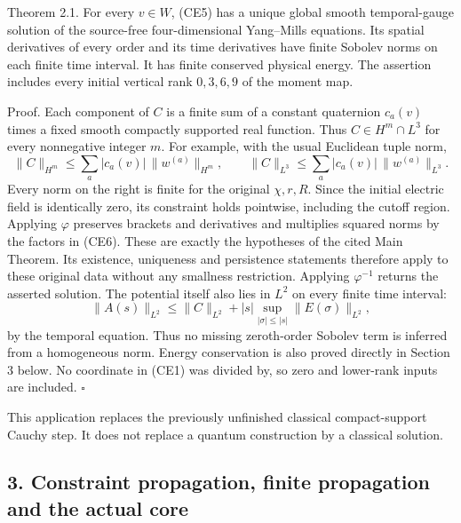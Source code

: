 \documentclass[11pt]{article}
\begin{document}
Theorem 2.1. For every \(v\in W\), (CE5) has a unique global smooth
temporal-gauge solution of the source-free four-dimensional Yang–Mills
equations. Its spatial derivatives of every order and its time
derivatives have finite Sobolev norms on each finite time interval.
It has finite conserved physical energy. The assertion includes every
initial vertical rank \(0,3,6,9\) of the moment map.

Proof. Each component of \(C\) is a finite sum of a constant
quaternion \(c_a(v)\) times a fixed smooth compactly supported real
function. Thus \(C\in H^m\cap L^3\) for every nonnegative integer \(m\).
For example, with the usual Euclidean tuple norm,
\[
 \|C\|_{H^m}\leq\sum_a |c_a(v)|\,\|w^{(a)}\|_{H^m},\qquad
 \|C\|_{L^3}\leq\sum_a |c_a(v)|\,\|w^{(a)}\|_{L^3}.
 \tag{CE7}
\]
Every norm on the right is finite for the original \(\chi,r,R\).
Since the initial electric field is identically zero, its constraint
holds pointwise, including the cutoff region. Applying \(\varphi\)
preserves brackets and derivatives and multiplies squared norms by
the factors in (CE6). These are exactly the hypotheses of the cited
Main Theorem. Its existence, uniqueness and persistence statements
therefore apply to these original data without any smallness
restriction. Applying \(\varphi^{-1}\) returns the asserted solution.
The potential itself also lies in \(L^2\) on every finite time interval:
\[
 \|A(s)\|_{L^2}\leq\|C\|_{L^2}
       +|s|\sup_{|\sigma|\leq|s|}\|E(\sigma)\|_{L^2},
\]
by the temporal equation. Thus no missing zeroth-order Sobolev term is
inferred from a homogeneous norm.
Energy conservation is also proved directly in Section 3 below.
No coordinate in (CE1) was divided by, so zero and lower-rank inputs
are included. \(\square\)

This application replaces the previously unfinished classical
compact-support Cauchy step. It does not replace a quantum
construction by a classical solution.

\subsection*{3. Constraint propagation, finite propagation and the actual core}
\end{document}
